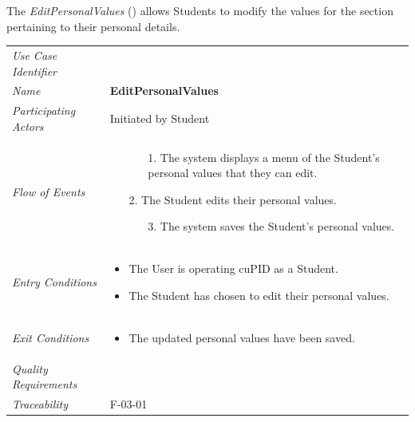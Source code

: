 \documentclass[12pt,letterpaper]{article}
\begin{document}
\newpage{}

The {\it EditPersonalValues} () allows Students to modify the values for the section pertaining to their personal details.

\begin{center}
	\begin{tabu} to 
		\toprule
		Use Case Identifier &  \\
		Name & {\bf EditPersonalValues} \\
		Participating Actors & Initiated by Student \\
		Flow of Events & 
		\begin{minipage}[t]{\linewidth}
		    \begin{enumerate}
		        \item[]
		        \begin{enumerate}
				    \item[1.] The system displays a menu of the Student's personal values that they can edit.
		        \end{enumerate}
	            \item[2.] The Student edits their personal values.
	            \begin{enumerate}
				    \item[3.] The system saves the Student's personal values.
		        \end{enumerate}
			\end{enumerate}
		\end{minipage} \\

		Entry Conditions &
		\begin{minipage}[t]{\linewidth}
			\begin{itemize}
			    \item The User is operating cuPID as a Student.
			    \item The Student has chosen to edit their personal values.
	        \end{itemize}
		\end{minipage} \\

		Exit Conditions &
		\begin{minipage}[t]{\linewidth}
			\begin{itemize}
			    \item The updated personal values have been saved.
	        \end{itemize}
		\end{minipage} \\

		Quality Requirements & \\

		Traceability &  F-03-01\\
		\toprule
	\end{tabu}
\end{center}
\end{document}
